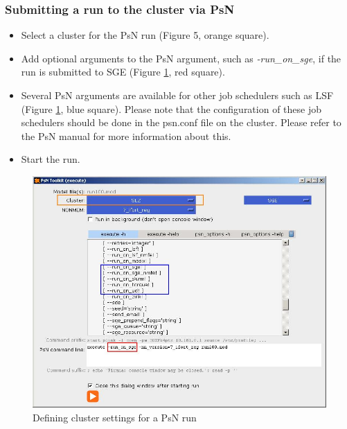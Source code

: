 \subsubsection*{Submitting a run to the cluster via PsN}
  \begin{itemize}
  \item Select a cluster for the PsN run (Figure 5, orange square).
  \item Add optional arguments to the PsN argument, such as
    \emph{-run\_on\_sge}, if the run is submitted to SGE (Figure  \ref{fig:Fig5},
    red square).
  \item Several PsN arguments are available for other job schedulers
    such as LSF (Figure  \ref{fig:Fig5}, blue square). Please note that
    the configuration of these job schedulers should be done in the
    psn.conf file on the cluster. Please refer to the PsN manual for
    more information about this.
  \item Start the run.
\end{itemize}

\begin{figure}[h] \centering
    \includegraphics[scale=.4]{images/cluster_5.JPG}
    \caption{Defining cluster settings for a PsN run\label{fig:Fig5}
}
\end{figure}

